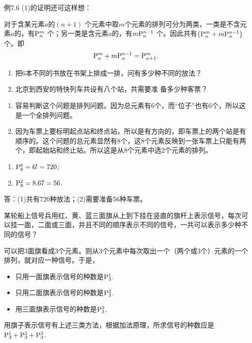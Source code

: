 例7.6 (1)的证明还可这样想：

对于含某元素$a$的$(n+1)$ 个元素中取$m$个元素的排列可分为两类，一类是不含元素$a$的，有$\perm{n}{m}$ 个；另一类是含元素$a$的，有$m\perm{n}{n-1}$ 个。因此共有$\left(\perm{n}{m}+m\perm{n}{n-1}\right)$个。即
\[\perm{n}{m}+m\perm{n}{n-1}=\perm{n+1}{m}.\]

\begin{example}
\begin{enumerate}[(1)]
    \item 把6本不同的书放在书架上排成一排，问有多少种不同的放法？
    \item 北京到西安的特快列车共设有八个站，共需要准
备多少种客票？
\end{enumerate}
\end{example}

\begin{analyze}
\begin{enumerate}
    \item 容易判断这个问题是排列问题。因为总元素有6个，而“位子”也有6个，所以这是一个全排列问题。
    \item 因为车票上要标明起点站和终点站，所以是有方向的，即车票上的两个站是有顺序的。这个问题的总元素显然有8个，这8个元素反映到一张车票上只能有两个，即起始站和终止站。所以这是从8个元素中选2个元素的排列。
\end{enumerate}
\end{analyze}

\begin{solution}
\begin{enumerate}[(1)]
    \item $\perm{6}{6}=6!=720$;
    \item $\perm{8}{2}=8\x 7=56$.
\end{enumerate}
答：(1)共有720种放法；(2)需要准备56种车票。
\end{solution}

\begin{example}
    某轮船上信号兵用红、黄、蓝三面旗从上到下挂在竖直的旗杆上表示信号，每次可以挂一面，二面或三面，并且不同的顺序表示不同的信号，一共可以表示多少种不同的信号？
\end{example}

\begin{analyze}
可以把3面旗看成3个元素。则从3个元素中每次取出一个（两个或3个）元素的一个排列，就对应一种信号。于是，
\begin{itemize}
    \item 只用一面旗表示信号的种数是$\perm{3}{1}$.
    \item 只用二面旗表示信号的种数是$\perm{3}{2}$.
    \item 用三面旗表示信号的种数是$\perm{3}{3}$.
\end{itemize}
用旗子表示信号有上述三类方法，根据加法原理，所求信号的种数应是$\perm{3}{1}+\perm{3}{2}+\perm{3}{3}$.
\end{analyze}

